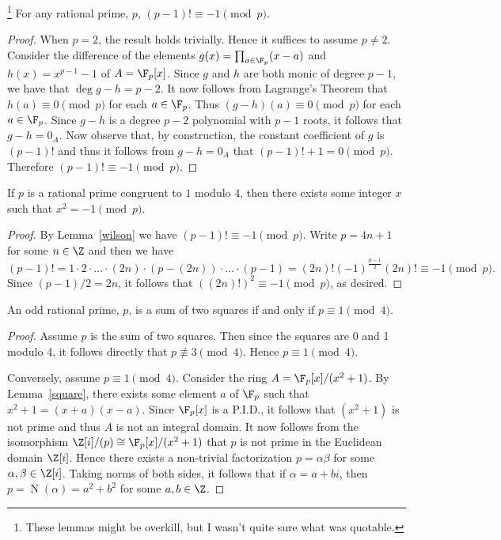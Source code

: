 \documentclass[10pt]{amsart}
\begin{document}
\begin{lem}\footnote{These lemmas might be overkill, but I wasn't quite sure what was quotable.}\label{wilson}
  For any rational prime, $p$, $(p-1)! \equiv -1 \pmod{p}$.
  \begin{proof}
    When $p = 2$, the result holds trivially.  
    Hence it suffices to assume $p \neq 2$.
    Consider the difference of the elements $g(x) = \prod_{a \in \F_p}(x - a)$ and $h(x) = x^{p-1} - 1$ of $A = \F_p[x]$.
    Since $g$ and $h$ are both monic of degree $p-1$, we have that $\deg{g - h} = p - 2$.
    It now follows from Lagrange's Theorem that $h(a) \equiv 0 \pmod{p}$ for each $a \in \F_p$.
    Thus $(g-h)(a) \equiv 0 \pmod{p}$ for each $a \in \F_p$.
    Since $g-h$ is a degree $p-2$ polynomial with $p-1$ roots, it follows that $g-h = 0_A$.
    Now observe that, by construction, the constant coefficient of $g$ is $(p-1)!$ and thus it follows from $g - h = 0_A$ that $(p-1)! + 1 = 0 \pmod{p}$.
    Therefore $(p-1)! \equiv -1 \pmod{p}$.
  \end{proof}
\end{lem}

\begin{lem}\label{square}
  If $p$ is a rational prime congruent to $1$ modulo $4$, then there exists some integer $x$ such that $x^2 = -1 \pmod{p}$.
\end{lem}
\begin{proof}
  By Lemma~\ref{wilson} we have $(p-1)! \equiv -1 \pmod{p}$.
  Write $p = 4n + 1$ for some $n \in \Z$ and then we have 
  $$(p-1)! = 1 \cdot 2 \cdot \ldots \cdot (2n) \cdot (p - (2n)) \cdot \ldots \cdot (p - 1) = (2n)!(-1)^{\frac{p-1}{2}}(2n)! \equiv -1 \pmod{p}.$$
  Since $(p-1)/2 = 2n$, it follows that $((2n)!)^2 \equiv -1 \pmod{p}$, as desired.
\end{proof}

\begin{lem}
  An odd rational prime, $p$, is a sum of two squares if and only if $p \equiv 1 \pmod{4}$.
  \begin{proof}
    Assume $p$ is the sum of two squares.
    Then since the squares are 0 and 1 modulo 4, it follows directly that $p \not \equiv 3 \pmod{4}$.
    Hence $p \equiv 1 \pmod{4}$.

    Conversely, assume $p \equiv 1 \pmod{4}$.
    Consider the ring $A = \F_p[x]/(x^2 + 1)$.
    By Lemma~\ref{square}, there  exists some element $a$ of $\F_p$ such that $x^2 + 1 = (x + a)(x - a)$.
    Since $\F_p[x]$ is a P.I.D., it follows that $(x^2 + 1)$ is not prime and thus $A$ is not an integral domain.
    It now follows from the isomorphism $\Z[i]/(p) \cong \F_p[x]/(x^2 + 1)$ that $p$ is not prime in the Euclidean domain $\Z[i]$.
    Hence there exists a non-trivial factorization $p = \alpha\beta$ for some $\alpha, \beta \in \Z[i]$.
    Taking norms of both sides, it follows that if $\alpha = a+bi$, then $p = \operatorname{N}(\alpha) = a^2 + b^2$ for some $a,b \in \Z$.
  \end{proof}
\end{lem}
\end{document}
